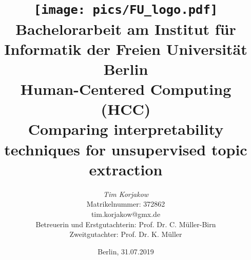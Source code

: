%
\begin{titlepage}

\title{\texttt{[image: pics/FU\_logo.pdf]}\\
{\small Bachelorarbeit am Institut für Informatik der Freien Universität Berlin}\\
{\small Human-Centered Computing (HCC)}\\
[6ex]
{\LARGE Comparing interpretability techniques for unsupervised topic extraction}}

\author{
{\emph{\normalsize Tim Korjakow}}\\
{\normalsize Matrikelnummer: 372862}\\
{\normalsize tim.korjakow@gmx.de}\\ 
[18ex]   
{\normalsize Betreuerin und Erstgutachterin: Prof. Dr. C. Müller-Birn} \\
{\normalsize Zweitgutachter: Prof. Dr. K. Müller}}
\vspace{6ex}
\date{\normalsize Berlin, 31.07.2019}
 
\maketitle  

\end{titlepage}
